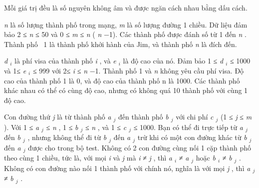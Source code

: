       Mỗi giá trị đều là số nguyên không âm và được ngăn cách nhau bằng dấu cách.     

\emph{       n      }      là số lượng thành phố trong mạng,      \emph{       m      }      là số lượng đường 1 chiều. Dữ liệu đảm bảo 2 ≤      \emph{       n      }      ≤ 50 và 0 ≤      \emph{       m      }      ≤      \emph{       n      }      (      \emph{       n      }      −1). Các thành phố được đánh số từ 1 đến      \emph{       n      }      . Thành phố  1 là thành phố khởi hành của Jim, và thành phố      \emph{       n      }      là đích đến.     

\emph{       d       $_        i       $}      là phí visa của thành phố      \emph{       i      }      , và      \emph{       e       $_        i       $}      là độ cao của nó. Đảm bảo 1 ≤      \emph{       d       $_        i       $}      ≤ 1000 và 1≤      \emph{       e       $_        i       $}      ≤ 999 với 2≤      \emph{       i      }      ≤      \emph{       n      }      −1. Thành phố 1 và      \emph{       n      }      không yêu cầu phí visa. Độ cao của thành phố 1 là 0, và độ cao của thành phố n là 1000. Các thành phố khác nhau có thể có cùng độ cao, nhưng có không quá 10 thành phố với cùng 1 độ cao.     

      Con đường thứ      \emph{       j      }      là từ thành phố      \emph{       a       $_        j       $}      đến thành phố      \emph{       b       $_        j       $}      với chi phí      \emph{       c       $_        j       $}      (1 ≤      \emph{       j      }      ≤      \emph{       m      }      ). Với 1 ≤      \emph{       a       $_        j       $}      ≤      \emph{       n      }      , 1 ≤      \emph{       b       $_        j       $}      ≤      \emph{       n      }      , và 1 ≤      \emph{       c       $_        j       $}      ≤ 1000. Bạn có thể đi trực tiếp từ      \emph{       a       $_        j       $}      đến      \emph{       b       $_        j       $}      , nhưng không thể đi từ      \emph{       b       $_        j       $}      đến      \emph{       a       $_        j       $}      trừ khi có một con đường khác từ      \emph{       b       $_        j       $}      đến      \emph{       a       $_        j       $}      được cho trong bộ test. Không có 2 con đường cùng nối 1 cặp thành phố theo cùng 1 chiều, tức là, với mọi      \emph{       i      }      và      \emph{       j      }      mà      \emph{       i      }      ≠      \emph{       j      }      , thì      \emph{       a       $_        i       $}      ≠      \emph{       a       $_        j       $}      hoặc      \emph{       b       $_        i       $}      ≠      \emph{       b       $_        j       $}      . Không có con đường nào nối 1 thành phố với chính nó, nghĩa là với mọi      \emph{       j      }      , thì      \emph{       a       $_        j       $}      ≠      \emph{       b       $_        j       $}      .     

